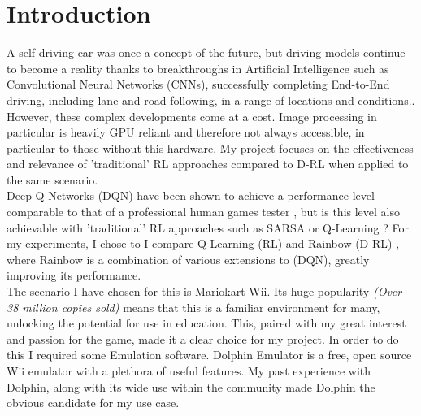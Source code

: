 \chapter*{Introduction}
A self-driving car was once a concept of the future, but driving models continue to become a reality thanks to breakthroughs in Artificial Intelligence such as Convolutional Neural Networks (CNNs), successfully completing End-to-End driving, including lane and road following, in a range of locations and conditions.\cite{DBLP:journals/corr/BojarskiTDFFGJM16}. However, these complex developments come at a cost. Image processing in particular is heavily GPU reliant and therefore not always accessible, in particular to those without this hardware. My project focuses on the effectiveness and relevance of 'traditional' RL approaches compared to D-RL when applied to the same scenario.\\
Deep Q Networks (DQN) have been shown to achieve a performance level comparable to that of a professional human games tester \cite{mnih2015human}, but is this level also achievable with 'traditional' RL approaches such as SARSA \cite{rummery1994line} or Q-Learning \cite{watkins1992q}? For my experiments, I chose to I compare Q-Learning (RL) and Rainbow (D-RL) \cite{hessel2018rainbow}, where Rainbow is a combination of various extensions to (DQN), greatly improving its performance. \\
The scenario I have chosen for this is Mariokart Wii. Its huge popularity \textit{(Over 38 million copies sold)} means that this is a familiar environment for many, unlocking the potential for use in education. This, paired with my great interest and passion for the game, made it a clear choice for my project. In order to do this I required some Emulation software. Dolphin Emulator \cite{DolphinEmulator} is a free, open source Wii emulator with a plethora of useful features. My past experience with Dolphin, along with its wide use within the community made Dolphin the obvious candidate for my use case.